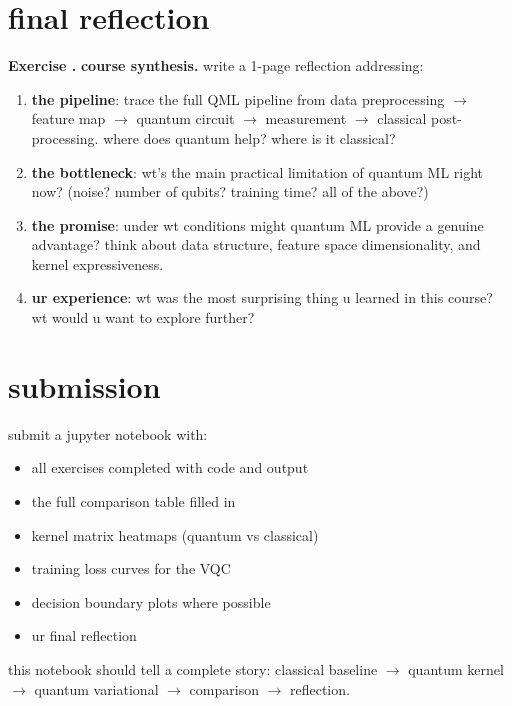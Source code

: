 \documentclass[11pt,a4paper]{article}
\theoremstyle{definition}
\theoremstyle{remark}
\newcounter{exercise}[section]
\newenvironment{exercise}{\refstepcounter{exercise}\par\medskip\noindent\textbf{Exercise \theexercise.}\rmfamily}{\medskip}
\begin{document}
\section{final reflection}

\begin{exercise}
\textbf{course synthesis.}
write a 1-page reflection addressing:
\begin{enumerate}[leftmargin=*]
  \item \textbf{the pipeline}: trace the full QML pipeline from data preprocessing $\to$ feature map $\to$ quantum circuit $\to$ measurement $\to$ classical post-processing. where does quantum help? where is it classical?
  \item \textbf{the bottleneck}: wt's the main practical limitation of quantum ML right now? (noise? number of qubits? training time? all of the above?)
  \item \textbf{the promise}: under wt conditions might quantum ML provide a genuine advantage? think about data structure, feature space dimensionality, and kernel expressiveness.
  \item \textbf{ur experience}: wt was the most surprising thing u learned in this course? wt would u want to explore further?
\end{enumerate}
\end{exercise}

\section{submission}

submit a jupyter notebook with:
\begin{itemize}[leftmargin=*]
  \item all exercises completed with code and output
  \item the full comparison table filled in
  \item kernel matrix heatmaps (quantum vs classical)
  \item training loss curves for the VQC
  \item decision boundary plots where possible
  \item ur final reflection
\end{itemize}

this notebook should tell a complete story: classical baseline $\to$ quantum kernel $\to$ quantum variational $\to$ comparison $\to$ reflection.
\end{document}

